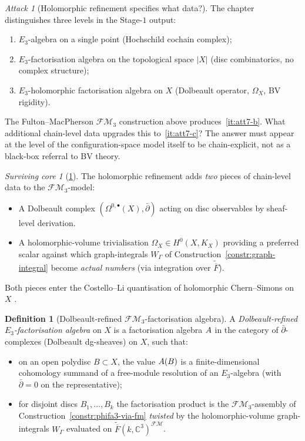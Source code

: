 \documentclass[11pt]{article}
\theoremstyle{definition}
\newtheorem{definition}[theorem]{Definition}
\theoremstyle{remark}
\newtheorem{attack}[theorem]{Attack}
\newtheorem{survivor}[theorem]{Surviving core}
\newcommand{\FMbar}{\overline{F}}
\newcommand{\FM}{\mathcal{FM}}
\begin{document}
\begin{attack}[Holomorphic refinement specifies what data?]
\label{att:cycle-7}
The chapter distinguishes three levels in the Stage-$1$ output:
\begin{enumerate}
 \item\label{it:att7-a} $E_3$-algebra on a single point (Hochschild cochain complex);
 \item\label{it:att7-b} $E_3$-factorisation algebra on the topological space $|X|$ (disc combinatorics, no complex structure);
 \item\label{it:att7-c} $E_3$-holomorphic factorisation algebra on $X$ (Dolbeault operator, $\Omega_X$, BV rigidity).
\end{enumerate}
The Fulton--MacPherson $\FM_3$ construction above produces~\ref{it:att7-b}.
What additional chain-level data upgrades this to~\ref{it:att7-c}?
The answer must appear at the level of the configuration-space model
itself to be chain-explicit, not as a black-box referral to BV
theory.
\end{attack}

\begin{survivor}[\ref{att:cycle-7}]
The holomorphic refinement adds \emph{two} pieces of chain-level data
to the $\FM_3$-model:
\begin{itemize}
 \item[(i)] A Dolbeault complex $(\Omega^{0, \bullet}(X), \bar\partial)$
       acting on disc observables by sheaf-level derivation.
 \item[(ii)] A holomorphic-volume trivialisation $\Omega_X \in
       H^0(X, K_X)$ providing a preferred scalar against which
       graph-integrals $W_\Gamma$ of Construction~\ref{constr:graph-integral}
       become \emph{actual numbers} (via integration over
       $\widetilde{\FMbar}$).
\end{itemize}
Both pieces enter the Costello--Li quantisation of holomorphic
Chern--Simons on $X$ \cite{CostelloLi2016, CostelloLi2020}.
\end{survivor}

\begin{definition}[Dolbeault-refined $\FM_3$-factorisation algebra]
\label{def:dolbeault-fm}
A \emph{Dolbeault-refined $E_3$-factorisation algebra} on $X$ is a
factorisation algebra $A$ in the category of $\bar\partial$-complexes
(Dolbeault dg-sheaves) on $X$, such that:
\begin{itemize}
 \item on an open polydisc $B \subset X$, the value $A(B)$ is a
       finite-dimensional cohomology summand of a free-module resolution
       of an $E_3$-algebra (with $\bar\partial = 0$ on the
       representative);
 \item for disjoint discs $B_1, \ldots, B_k$ the factorisation
       product is the $\FM_3$-assembly of
       Construction~\ref{constr:phifa3-via-fm} \emph{twisted} by the
       holomorphic-volume graph-integrals $W_\Gamma$ evaluated on
       $\widetilde{\FMbar}(k, \mathbb{C}^3)^{\FM}$.
\end{itemize}
\end{definition}
\end{document}
